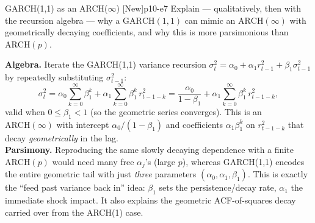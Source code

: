 \begin{exercise}{GARCH(1,1) as an ARCH($\infty$) \quad\textnormal{[New]}}{p10-e7}
Explain --- qualitatively, then with the recursion algebra --- why a
$\mathrm{GARCH}(1,1)$ can mimic an $\mathrm{ARCH}(\infty)$ with geometrically
decaying coefficients, and why this is more parsimonious than $\mathrm{ARCH}(p)$.
\end{exercise}
\begin{solution}
\textbf{Algebra.} Iterate the GARCH(1,1) variance recursion
$\sigma_t^2=\alpha_0+\alpha_1 r_{t-1}^2+\beta_1\sigma_{t-1}^2$ by repeatedly
substituting $\sigma_{t-1}^2$:
\[
\sigma_t^2=\alpha_0\sum_{k=0}^{\infty}\beta_1^{k}
+\alpha_1\sum_{k=0}^{\infty}\beta_1^{k}\,r_{t-1-k}^2
=\frac{\alpha_0}{1-\beta_1}+\alpha_1\sum_{k=0}^{\infty}\beta_1^{k}\,r_{t-1-k}^2 ,
\]
valid when $0\le\beta_1<1$ (so the geometric series converges). This is an
$\mathrm{ARCH}(\infty)$ with intercept $\alpha_0/(1-\beta_1)$ and coefficients
$\alpha_1\beta_1^{k}$ on $r_{t-1-k}^2$ that decay \emph{geometrically} in the lag.\\
\textbf{Parsimony.} Reproducing the same slowly decaying dependence with a finite
$\mathrm{ARCH}(p)$ would need many free $\alpha_j$'s (large $p$), whereas
GARCH(1,1) encodes the entire geometric tail with just \emph{three} parameters
$(\alpha_0,\alpha_1,\beta_1)$. This is exactly the ``feed past variance back in''
idea: $\beta_1$ sets the persistence/decay rate, $\alpha_1$ the immediate shock
impact. It also explains the geometric ACF-of-squares decay carried over from the
ARCH(1) case.
\end{solution}
